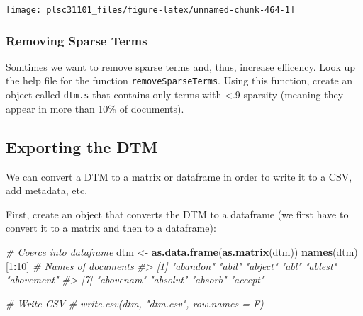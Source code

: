 \documentclass[
]{book}
\newenvironment{Shaded}{\begin{snugshade}}{\end{snugshade}}
\newcommand{\CommentTok}[1]{\textcolor[rgb]{0.56,0.35,0.01}{\textit{#1}}}
\newcommand{\DecValTok}[1]{\textcolor[rgb]{0.00,0.00,0.81}{#1}}
\newcommand{\KeywordTok}[1]{\textcolor[rgb]{0.13,0.29,0.53}{\textbf{#1}}}
\newcommand{\NormalTok}[1]{#1}
\newcommand{\OperatorTok}[1]{\textcolor[rgb]{0.81,0.36,0.00}{\textbf{#1}}}
\newcommand{\StringTok}[1]{\textcolor[rgb]{0.31,0.60,0.02}{#1}}
\begin{document}
\begin{center}\texttt{[image: plsc31101\_files/figure-latex/unnamed-chunk-464-1]} \end{center}

\hypertarget{removing-sparse-terms}{%
\subsubsection*{Removing Sparse Terms}\label{removing-sparse-terms}}

Somtimes we want to remove sparse terms and, thus, increase efficency. Look up the help file for the function \texttt{removeSparseTerms}. Using this function, create an object called \texttt{dtm.s} that contains only terms with \textless.9 sparsity (meaning they appear in more than 10\% of documents).

\begin{Shaded}
\end{Shaded}

\hypertarget{exporting-the-dtm}{%
\subsection{Exporting the DTM}\label{exporting-the-dtm}}

We can convert a DTM to a matrix or dataframe in order to write it to a CSV, add metadata, etc.

First, create an object that converts the DTM to a dataframe (we first have to convert it to a matrix and then to a dataframe):

\begin{Shaded}
\begin{Highlighting}[]
\CommentTok{# Coerce into dataframe}
\NormalTok{dtm <-}\StringTok{ }\KeywordTok{as.data.frame}\NormalTok{(}\KeywordTok{as.matrix}\NormalTok{(dtm))}
\KeywordTok{names}\NormalTok{(dtm)[}\DecValTok{1}\OperatorTok{:}\DecValTok{10}\NormalTok{]  }\CommentTok{# Names of documents}
\CommentTok{#>  [1] "abandon"   "abil"      "abject"    "abl"       "ablest"    "abovement"}
\CommentTok{#>  [7] "abovenam"  "absolut"   "absorb"    "accept"}

\CommentTok{# Write CSV}
\CommentTok{# write.csv(dtm, "dtm.csv", row.names = F)}
\end{Highlighting}
\end{Shaded}
\end{document}
